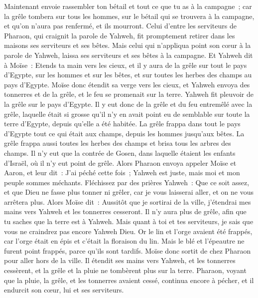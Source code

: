 \begin{multicols}{2}
Maintenant envoie rassembler ton bétail et tout ce que tu as à la campagne~; car la grêle tombera sur tous les hommes, sur le bétail qui se trouvera à la campagne, et qu'on n'aura pas renfermé, et ils mourront.
Celui d'entre les serviteurs de Pharaon, qui craignit la parole de Yahweh, fit promptement retirer dans les maisons ses serviteurs et ses bêtes.
Mais celui qui n'appliqua point son cœur à la parole de Yahweh, laissa ses serviteurs et ses bêtes à la campagne.
Et Yahweh dit à Moïse~: Etends ta main vers les cieux, et il y aura de la grêle sur tout le pays d'Egypte, sur les hommes et sur les bêtes, et sur toutes les herbes des champs au pays d'Egypte.
Moïse donc étendit sa verge vers les cieux, et Yahweh envoya des tonnerres et de la grêle, et le feu se promenait sur la terre. Yahweh fit pleuvoir de la grêle sur le pays d'Egypte.
Il y eut donc de la grêle et du feu entremêlé avec la grêle, laquelle était si grosse qu'il n'y en avait point eu de semblable sur toute la terre d'Egypte, depuis qu'elle a été habitée.
La grêle frappa dans tout le pays d'Egypte tout ce qui était aux champs, depuis les hommes jusqu'aux bêtes. La grêle frappa aussi toutes les herbes des champs et brisa tous les arbres des champs.
Il n'y eut que la contrée de Gosen, dans laquelle étaient les enfants d'Israël, où il n'y eut point de grêle.
Alors Pharaon envoya appeler Moïse et Aaron, et leur dit~: J'ai péché cette fois~; Yahweh est juste, mais moi et mon peuple sommes méchants.
Fléchissez par des prières Yahweh~: Que ce soit assez, et que Dieu ne fasse plus tonner ni grêler, car je vous laisserai aller, et on ne vous arrêtera plus.
Alors Moïse dit~: Aussitôt que je sortirai de la ville, j'étendrai mes mains vers Yahweh et les tonnerres cesseront. Il n'y aura plus de grêle, afin que tu saches que la terre est à Yahweh.
Mais quant à toi et tes serviteurs, je sais que vous ne craindrez pas encore Yahweh Dieu.
Or le lin et l'orge avaient été frappés, car l'orge était en épis et c'était la floraison du lin.
 Mais le blé et l'épeautre ne furent point frappés, parce qu'ils sont tardifs.
Moïse donc sortit de chez Pharaon pour aller hors de la ville. Il étendit ses mains vers Yahweh, et les tonnerres cessèrent, et la grêle et la pluie ne tombèrent plus sur la terre.
Pharaon, voyant que la pluie, la grêle, et les tonnerres avaient cessé, continua encore à pécher, et il endurcit son cœur, lui et ses serviteurs.

\end{multicols}
